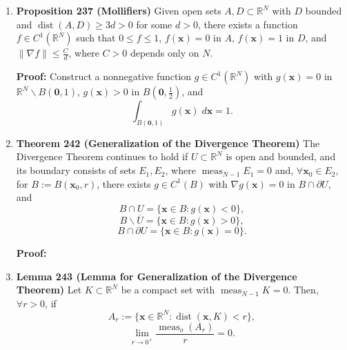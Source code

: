 \documentclass[11pt]{article}
\newcommand{\mqed}{\quad \blacksquare}
\newcommand{\meas}{\operatorname{meas}}
\newcommand{\dist}{\operatorname{dist}}
\renewcommand{\div}{\operatorname{div}}
\newcommand{\bzero}{\mathbf{0}}
\newcommand{\bx}{\mathbf{x}}
\newcommand{\bff}{\mathbf{f}}
\begin{document}
\begin{enumerate}
{\bf Proof:} Apply the Divergence Theorem to the function
$\bff: \overline{U} \rightarrow \mathbb{R}^N$ defined by
\[f_j(\bx) = \left\{
    \begin{array}{cc}
        f(\bx)g(\bx) & j = i,    \\
        0            & j \neq i. \\
    \end{array}
\right.\]
Then, since
\[\div \bff
 = \sum_{j = 1}^N \frac{\partial f_i}{\partial x_j}
 = \frac{\partial(fg)}{\partial x_j}
 = f\frac{\partial g}{\partial x_j} + g\frac{\partial f}{\partial x_j},\]
\[\int_U \left(f\frac{\partial g}{\partial x_j}
 + g\frac{\partial f}{\partial x_j}\right) \; d\bx
 = \int_U \div \bff \; d\bx
 = \int_{\partial U} \bff \cdot \nu \; d\mathcal{H}^{N - 1}
 = \int_{\partial U} fg\nu_i \; d\mathcal{H}^{N - 1}. \mqed\]

\item \textbf{Proposition 237 (Mollifiers)}
Given open sets $A,D \subset \mathbb{R}^N$ with $D$ bounded and
$\dist(A,D) \geq 3d > 0$ for some $d > 0$, there exists a function
$f \in C^1(\mathbb{R}^N)$ such that $0 \leq f \leq 1$, $f(\bx) = 0$ in $A$,
$f(\bx) = 1$ in $D$, and $\|\nabla f\| \leq \frac{C}{d}$, where $C > 0$
depends only on $N$.

{\bf Proof:} Construct a nonnegative function $g \in C^1(\mathbb{R}^N)$ with
$g(\bx) = 0$ in $\mathbb{R}^N\backslash B(\bzero,1)$, $g(\bx) > 0$ in
$B(\bzero,\frac12)$, and \[\int_{B(\bzero,1)} g(\bx) \; d\bx = 1.\]

\item \textbf{Theorem 242 (Generalization of the Divergence Theorem)}
The Divergence Theorem continues to hold if $U \subset \mathbb{R}^N$ is open
and bounded, and its boundary consists of sets $E_1, E_2$, where
$\meas_{N - 1} E_1 = 0$ and, $\forall \bx_0 \in E_2$, for $B := B(\bx_0,r)$,
there exists $g \in C^1(B)$ with $\nabla g(\bx) = 0$ in $B \cap \partial U$,
and
\[B \cap U = \{\bx \in B : g(\bx) < 0\},\]
\[B \backslash \overline{U} = \{\bx \in B : g(\bx) > 0\},\]
\[B \cap \partial U = \{\bx \in B : g(\bx) = 0\}.\]

{\bf Proof:} 

\item \textbf{Lemma 243 (Lemma for Generalization of the Divergence Theorem)}
Let $K \subset \mathbb{R}^N$ be a compact set with $\meas_{N - 1} K = 0$.
Then, $\forall r > 0$, if
\[A_r := \{\bx \in \mathbb{R}^N : \dist(\bx,K) < r\},\]
\[\lim_{r \rightarrow 0^+} \frac{\meas_o (A_r)}{r} = 0.\]


\end{enumerate}
\end{document}
